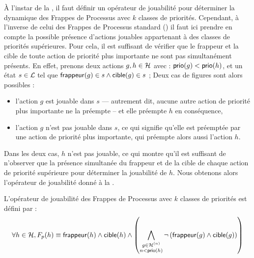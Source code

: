 À l'instar de la , il faut définir un opérateur de jouabilité
pour déterminer la dynamique des Frappes de Processus avec $k$ classes de priorités.
Cependant, à l'inverse de celui des Frappes de Processus standard ()
il faut ici prendre en compte la possible présence d'actions jouables appartenant à des
classes de priorités supérieures.
Pour cela, il est suffisant de vérifier que le frappeur et la cible de toute action
de priorité plus importante ne sont pas simultanément présents.
En effet, prenons deux actions $g, h \in \mathcal{H}$ avec : $\mathsf{prio}(g) < \mathsf{prio}(h)$, et
un état $s \in \mathcal{L}$ tel que $\mathsf{frappeur}(g) \in s \wedge \mathsf{cible}(g) \in s$ ;
Deux cas de figures sont alors possibles :
\begin{itemize}
  \item l'action $g$ est jouable dans $s$ --- autrement dit, aucune autre action de priorité plus
    importante ne la préempte -- et elle préempte $h$ en conséquence,
  \item l'action $g$ n'est pas jouable dans $s$, ce qui signifie qu'elle est préemptée par une
    action de priorité plus importante, qui préempte alors aussi l'action $h$.
\end{itemize}
Dans les deux cas, $h$ n'est pas jouable, ce qui montre qu'il est suffisant de n'observer
que la présence simultanée du frappeur et de la cible de chaque action de priorité supérieure
pour déterminer la jouabilité de $h$.
Nous obtenons alors l'opérateur de jouabilité donné à la .

\begin{definition}
  L'opérateur de jouabilité des Frappes de Processus avec $k$ classes de priorités est défini par :
  \[\forall h \in \mathcal{H}, F_{p}(h) \equiv \mathsf{frappeur}(h) \wedge \mathsf{cible}(h) \wedge
    \left( \bigwedge_{\substack{g \in \mathcal{H}^{(n)}\\n < \mathsf{prio}(h)}}
    \neg \left( \mathsf{frappeur}(g) \wedge \mathsf{cible}(g) \right) \right)\]
\end{definition}



